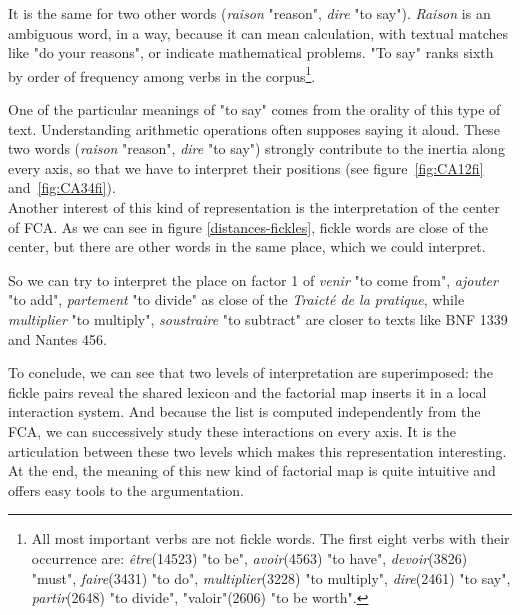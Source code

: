 \documentclass[preprint]{elsarticle}
\begin{document}
It is the same for two other words (\textit{raison} "reason", \textit{dire} "to say"). \textit{Raison} is an ambiguous word, in a way, because it can mean calculation, with textual matches like "do your reasons", or indicate mathematical problems. "To say" ranks sixth by order of frequency among verbs in the corpus\footnote{All most important verbs are not fickle words. The first eight verbs with their occurrence are: \textit{être}(14523) "to be", \textit{avoir}(4563) "to have", \textit{devoir}(3826) "must", \textit{faire}(3431) "to do", \textit{multiplier}(3228) "to multiply", \textit{dire}(2461) "to say", \textit{partir}(2648) "to divide", "valoir"(2606) "to be worth".}.

One of the particular meanings of "to say" comes from the orality of this type of text. Understanding arithmetic operations often supposes saying it aloud. These two words (\textit{raison} "reason", \textit{dire} "to say") strongly contribute to the inertia along every axis, so that we have to interpret their positions (see figure~\ref{fig:CA12fi} and~\ref{fig:CA34fi}).\\

Another interest of this kind of representation is the interpretation of the center of FCA. As we can see in figure \ref{distances-fickles}, fickle words are close of the center, but there are other words in the same place, which we could interpret. 

So we can try to interpret the place on factor 1  of \textit{venir} "to come from", \textit{ajouter} "to add", \textit{partement} "to divide" as close of the  \textit{Traicté de la pratique}, while \textit{multiplier} "to multiply",  \textit{soustraire} "to subtract" are closer to texts like BNF 1339 and Nantes 456.

To conclude, we can see that two levels of interpretation are superimposed: the fickle pairs reveal the shared lexicon and the factorial map inserts it in a local interaction system. And because the list is computed independently from the FCA, we can successively study these interactions on every axis. It is the articulation between these two levels which makes this representation interesting. At the end, the meaning of this new kind of factorial map is quite intuitive and offers easy tools to the argumentation.
\end{document}
